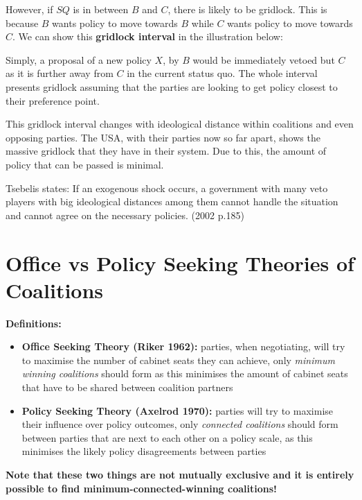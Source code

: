 \documentclass[12pt, letterpaper]{article}
\begin{document}
However, if $SQ$ is in between $B$ and $C$, there is likely to be gridlock. This is because $B$ wants policy to move towards $B$ while $C$ wants policy to move towards $C$. We can show this \textbf{gridlock interval} in the illustration below:
\begin{center}
\end{center}
Simply, a proposal of a new policy $X$, by $B$ would be immediately vetoed but $C$ as it is further away from $C$ in the current status quo. The whole interval presents gridlock assuming that the parties are looking to get policy closest to their preference point.

This gridlock interval changes with ideological distance within coalitions and even opposing parties. The USA, with their parties now so far apart, shows the massive gridlock that they have in their system. Due to this, the amount of policy that can be passed is minimal.
\begin{center}
Tsebelis states: If an exogenous shock occurs, a government with many veto players with big ideological distances among them cannot handle the situation and cannot agree on the necessary policies. (2002 p.185)
\end{center}


\newpage
\section{Office vs Policy Seeking Theories of Coalitions}
\textbf{Definitions:}
\begin{itemize}
	\item \textbf{Office Seeking Theory (Riker 1962):} parties, when negotiating, will try to maximise the number of cabinet seats they can achieve, only \textit{minimum winning coalitions} should form as this minimises the amount of cabinet seats that have to be shared between coalition partners
	\item \textbf{Policy Seeking Theory (Axelrod 1970):} parties will try to maximise their influence over policy outcomes, only \textit{connected coalitions} should form between parties that are next to each other on a policy scale, as this minimises the likely policy disagreements between parties
\end{itemize}
\textbf{Note that these two things are not mutually exclusive and it is entirely possible to find minimum-connected-winning coalitions!}
\end{document}

